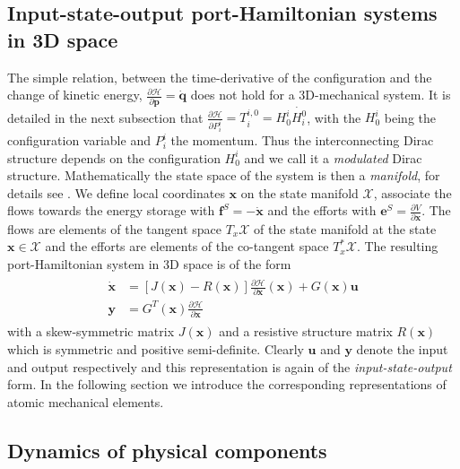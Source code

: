 \documentclass[a4paper,twoside, openright,12pt]{report}
\newcommand{\f}[1]{\boldsymbol{#1}}
\begin{document}
{\subsection{Input-state-output port-Hamiltonian systems in 3D space}
The simple relation, between the time-derivative of the configuration and the change of kinetic energy, $\frac{\partial \mathcal{H}}{\partial \f{p}}=\dot{\f{q}}$ does not hold for a 3D-mechanical system. It is detailed in the next subsection that $\frac{\partial \mathcal{H}}{\partial P_i^i} = T_i^{i,0} = H_0^i \dot{H_i^0}$, with the $H_0^i$ being the configuration variable and $P_i^i$ the momentum. Thus the interconnecting Dirac structure depends on the configuration $H_0^i$ and we call it a \emph{modulated} Dirac structure. Mathematically the state space of the system is then a \emph{manifold}, for details see \cite{Schaft_14}. We define local coordinates $\f{x}$ on the state manifold $\mathcal{X}$, associate the flows towards the energy storage with $\f{f}^S = -\dot{\f{x}}$ and the efforts with $\f{e}^S = \frac{\partial V}{\partial \f{x}}$. The flows are elements of the tangent space $T_x\mathcal{X}$ of the state manifold at the state $\f{x} \in \mathcal{X}$ and the efforts are elements of the co-tangent space $T_x^*\mathcal{X}$. The resulting port-Hamiltonian system in 3D space is of the form
\begin{eqnarray}
\begin{aligned}
\dot{\f{x}} &= [J(\f{x})-R(\f{x})]\frac{\partial \mathcal{H}}{\partial \f{x}}(\f{x}) + G(\f{x}) \f{u} \\
\f{y} &= G^T(\f{x})\frac{\partial \mathcal{H}}{\partial \f{x}}
\end{aligned}
\end{eqnarray}
with a skew-symmetric matrix $J(\f{x})$ and a resistive structure matrix $R(\f{x})$ which is symmetric and positive semi-definite. Clearly $\f{u}$ and $\f{y}$ denote the input and output respectively and this representation is again of the \emph{input-state-output} form. In the following section we introduce the corresponding representations of atomic mechanical elements.




\subsection{Dynamics of physical components}\label{SS:DynamicsPhysicalComponents}
}
\end{document}
